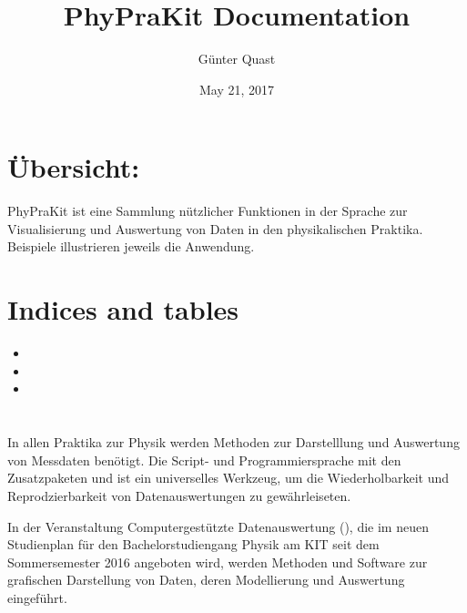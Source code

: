 \documentclass[letterpaper,10pt,english]{sphinxmanual}
\title{PhyPraKit Documentation}
\date{May 21, 2017}
\author{Günter Quast}
\begin{document}
\maketitle
\sphinxtableofcontents
{}\label{\detokenize{index::doc}}



\chapter{Übersicht:}
\label{\detokenize{index:ubersicht}}\label{\detokenize{index:dokumentation-von-phyprakit}}
PhyPraKit ist eine Sammlung nützlicher Funktionen in der Sprache
 zur Visualisierung und Auswertung von Daten
in den physikalischen Praktika.
Beispiele illustrieren jeweils die Anwendung.
\begin{quote}

\end{quote}


\chapter{Indices and tables}
\label{\detokenize{index:indices-and-tables}}\begin{itemize}
\item {} 

\item {} 

\item {} 

\end{itemize}


\chapter{}
\label{\detokenize{index:darstellung-und-auswertung-von-messdaten}}
In allen Praktika zur Physik werden Methoden zur Darstelllung
und Auswertung von Messdaten benötigt. Die Script- und
Programmiersprache  mit den Zusatzpaketen
 und  ist ein universelles
Werkzeug, um die Wiederholbarkeit und Reprodzierbarkeit von
Datenauswertungen zu gewährleiseten.

In der Veranstaltung \sphinxquotedblleft{}Computergestützte Datenauswertung\sphinxquotedblright{}
(), die im neuen Studienplan
für den Bachelorstudiengang Physik am KIT seit dem Sommersemester
2016 angeboten wird, werden Methoden und Software zur grafischen Darstellung von Daten, deren Modellierung und Auswertung eingeführt.
\end{document}
